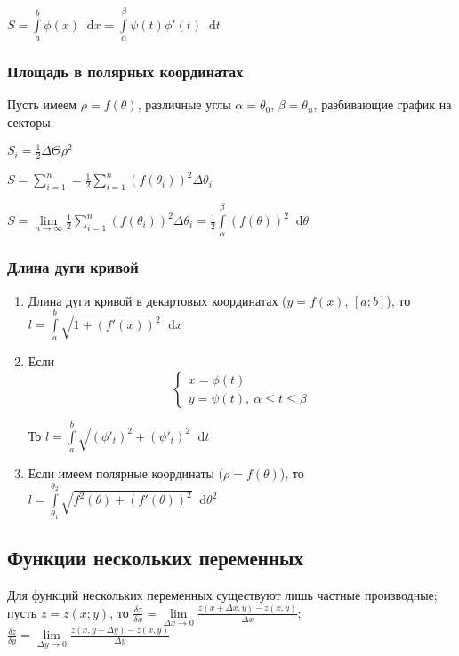 \documentclass{article}
\newcommand*\diff{\mathop{}\!\mathrm{d}}
\begin{document}
$S = \int\limits_{a}^{b} \phi(x) \diff x = \int\limits_{\alpha}^{\beta} \psi (t) \phi'(t) \diff t$

\subsubsection{Площадь в полярных координатах}

Пусть имеем $\rho = f (\theta)$, различные углы $\alpha = \theta_0$, $\beta = \theta_{n}$, разбивающие график на секторы.

\hfill

$S_{i} = \frac{1}{2} \Delta \Theta \rho^2$

$S = \sum\limits_{i = 1}^{n} = \frac{1}{2} \sum\limits_{i = 1}^{n} (f(\theta_i))^2 \Delta \theta_i$

$S = \lim\limits_{n \to \infty} \frac{1}{2} \sum\limits_{i = 1}^{n} (f(\theta_i))^2 \Delta \theta_i = \frac{1}{2} \int\limits_{\alpha}^{\beta} (f(\theta))^2 \diff \theta$

\subsubsection{Длина дуги кривой}

\begin{enumerate}
    \item Длина дуги кривой в декартовых координатах ($y = f(x)$, $[a; b]$), то $l = \int\limits_{a}^{b} \sqrt{1 + (f'(x))^2} \diff x$
    \item Если $$\begin{cases}
        x = \phi(t) \\
        y = \psi(t), \ \alpha \le t \le \beta
    \end{cases}$$

    То $l = \int\limits_{a}^{b} \sqrt{(\phi'_t)^2 + (\psi'_t)^2} \diff t$
    \item Если имеем полярные координаты ($\rho = f(\theta)$), то $l = \int\limits_{\theta_1}^{\theta_2} \sqrt{f^2(\theta) + (f'(\theta))^2} \diff \theta^2$
\end{enumerate}

\pagebreak
\subsection{Функции нескольких переменных}

Для функций нескольких переменных существуют лишь частные производные; пусть $z = z(x; y)$, то $\frac{\delta z}{\delta x} = \lim\limits_{\Delta x \to 0} \frac{z(x + \Delta x, y) - z(x, y)}{\Delta x}$; $\frac{\delta z}{\delta y} = \lim\limits_{\Delta y \to 0} \frac{z(x, y + \Delta y) - z(x, y)}{\Delta y}$
\end{document}
